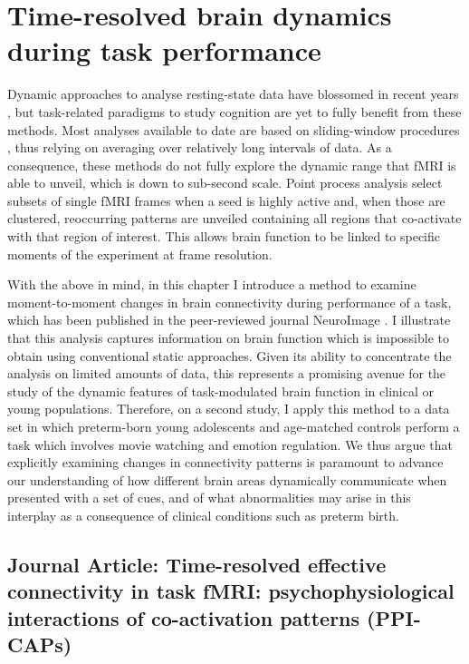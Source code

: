 \chapter{Time-resolved brain dynamics during task performance} \label{chapter:ch5}

Dynamic approaches to analyse resting-state data have blossomed in recent years \citep{Chang2010,Preti2017}, but task-related paradigms to study cognition are yet to fully benefit from these methods. Most analyses available to date are based on sliding-window procedures \citep{Kucyi2014,Di2015,Gonzalez-Castillo2018}, thus relying on averaging over relatively long intervals of data. As a consequence, these methods do not fully explore the dynamic range that fMRI is able to unveil, which is down to sub-second scale. Point process analysis \citep{Tagliazucchi2012,Liu2013} select subsets of single fMRI frames when a seed is highly active and, when those are clustered, reoccurring patterns are unveiled containing all regions that co-activate with that region of interest. This allows brain function to be linked to specific moments of the experiment at frame resolution. 

With the above in mind, in this chapter I introduce a method to examine moment-to-moment changes in brain connectivity during performance of a task, which has been published in the peer-reviewed journal NeuroImage \citep{Freitas2020}. I illustrate that this analysis captures information on brain function which is impossible to obtain using conventional static approaches. Given its ability to concentrate the analysis on limited amounts of data, this represents a promising avenue for the study of the dynamic features of task-modulated brain function in clinical or young populations. Therefore, on a second study, I apply this method to a data set in which preterm-born young adolescents and age-matched controls perform a task which involves movie watching and emotion regulation. We thus argue that explicitly examining changes in connectivity patterns is paramount to advance our understanding of how different brain areas dynamically communicate when presented with a set of cues, and of what abnormalities may arise in this interplay as a consequence of clinical conditions such as preterm birth. 

\section{Journal Article: Time-resolved effective connectivity in task fMRI: psychophysiological interactions of co-activation patterns (PPI-CAPs)} \label{section:ppicaps_method}

